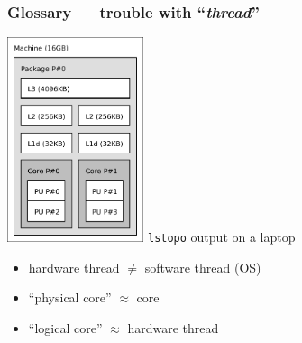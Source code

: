 \documentclass[xcolor={x11names,svgnames,psnames}]{beamer}
\begin{document}

\begin{frame}
  \frametitle{Glossary --- trouble with ``\emph{thread}''}

  \begin{center}
    \includegraphics[height=6cm]{lstopo_laptop.pdf}%
    \quad \small \texttt{lstopo} output on a laptop
  \end{center}

  \begin{itemize}
  \item hardware thread $\neq$ software thread (OS)
  \item ``physical core'' $\approx$ core
  \item ``logical core'' $\approx$ hardware thread
  \end{itemize}
  
\end{frame}






\end{document}
